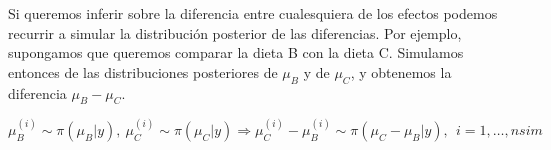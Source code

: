 \documentclass[
]{book}
\newenvironment{Shaded}{\begin{snugshade}}{\end{snugshade}}
\newcommand{\CommentTok}[1]{\textcolor[rgb]{0.56,0.35,0.01}{\textit{#1}}}
\newcommand{\ControlFlowTok}[1]{\textcolor[rgb]{0.13,0.29,0.53}{\textbf{#1}}}
\newcommand{\DecValTok}[1]{\textcolor[rgb]{0.00,0.00,0.81}{#1}}
\newcommand{\FloatTok}[1]{\textcolor[rgb]{0.00,0.00,0.81}{#1}}
\newcommand{\FunctionTok}[1]{\textcolor[rgb]{0.00,0.00,0.00}{#1}}
\newcommand{\NormalTok}[1]{#1}
\newcommand{\OtherTok}[1]{\textcolor[rgb]{0.56,0.35,0.01}{#1}}
\newcommand{\SpecialCharTok}[1]{\textcolor[rgb]{0.00,0.00,0.00}{#1}}
\newcommand{\StringTok}[1]{\textcolor[rgb]{0.31,0.60,0.02}{#1}}
\begin{document}
\begin{Shaded}
\end{Shaded}

Si queremos inferir sobre la diferencia entre cualesquiera de los efectos podemos recurrir a simular la distribución posterior de las diferencias. Por ejemplo, supongamos que queremos comparar la dieta B con la dieta C. Simulamos entonces de las distribuciones posteriores de \(\mu_B\) y de \(\mu_C\), y obtenemos la diferencia \(\mu_B-\mu_C\).

\[ \mu_B^{(i)} \sim \pi(\mu_B|y), \ \mu_C^{(i)} \sim \pi(\mu_C|y) \Rightarrow \mu_C^{(i)}-\mu_B^{(i)} \sim \pi(\mu_C-\mu_B|y), \ \ i=1,\ldots,nsim\]
\end{document}

